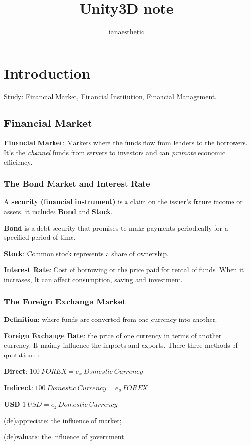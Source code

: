 \documentclass[10pt, a4paper]{article}
\author{ianaesthetic}
\title{Unity3D note}
\begin{document}
    \section{Introduction} 
        Study: Financial Market, Financial Institution, Financial Management.
        \subsection{Financial Market} 
        \textbf{Financial Market}: Markets where the funds flow from lenders to the borrowers. It's the \emph{channel} funds from servers to investors and can \emph{promote} economic efficiency.
        \subsubsection{The Bond Market and Interest Rate}
            A \textbf{security (financial instrument)} is a claim on the issuer's future income or assets.  it includes \textbf{Bond} and \textbf{Stock}.

            \textbf{Bond} is a debt security that promises to make payments periodically for a specified period of time. 
            
            \textbf{Stock}: Common stock represents a share of ownership.

            \textbf{Interest Rate}: Cost of borrowing or the price paid for rental of funds. When it increases, It can affect consumption, saving and investment. 
        \subsubsection{The Foreign Exchange Market}
            \textbf{Definition}: where funds are converted from one currency into another. 

            \textbf{Foreign Exchange Rate}: the price of one currency in terms of another currency. It mainly influence the imports and exports. There three methods of quotations : 
            
            \textbf{Direct}: $100\ FOREX = e_x\ Domestic\ Currency$ 

            \textbf{Indirect}: $100\ Domestic\ Currency = e_y\ FOREX$

            \textbf{USD} $1\ USD = e_z\ Domestic\ Currency$
            \newline 

            (de)appreciate: the influence of market; 
            
            (de)valuate: the influence of government
\end{document}
